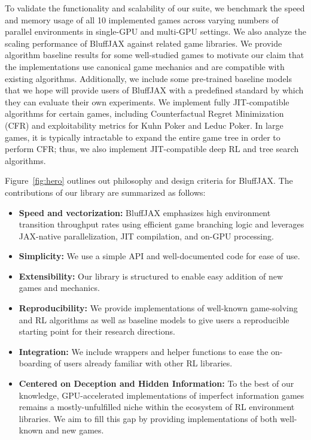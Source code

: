 To validate the functionality and scalability of our suite, we benchmark the speed and memory usage of all 10 implemented games across varying numbers of parallel environments in single-GPU and multi-GPU settings. We also analyze the scaling performance of BluffJAX against related game libraries. We provide algorithm baseline results for some well-studied games to motivate our claim that the implementations use canonical game mechanics and are compatible with existing algorithms. Additionally, we include some pre-trained baseline models that we hope will provide users of BluffJAX with a predefined standard by which they can evaluate their own experiments. We implement fully JIT-compatible algorithms for certain games, including Counterfactual Regret Minimization~\citep{zinkevich2007regret} (CFR) and exploitability metrics for Kuhn Poker and Leduc Poker. In large games, it is typically intractable to expand the entire game tree in order to perform CFR; thus, we also implement JIT-compatible deep RL and tree search algorithms.

Figure~\ref{fig:hero} outlines out philosophy and design criteria for BluffJAX. The contributions of our library are summarized as follows:
\begin{itemize}
    \item \textbf{Speed and vectorization:} BluffJAX emphasizes high environment transition throughput rates using efficient game branching logic and leverages JAX-native parallelization, JIT compilation, and on-GPU processing. 
    \item \textbf{Simplicity:} We use a simple API and well-documented code for ease of use.
    \item \textbf{Extensibility:} Our library is structured to enable easy addition of new games and mechanics.
    \item \textbf{Reproducibility:} We provide implementations of well-known game-solving and RL algorithms as well as baseline models to give users a reproducible starting point for their research directions.
    \item \textbf{Integration:} We include wrappers and helper functions to ease the on-boarding of users already familiar with other RL libraries.
    \item \textbf{Centered on Deception and Hidden Information:} To the best of our knowledge, GPU-accelerated implementations of imperfect information games remains a mostly-unfulfilled niche within the ecosystem of RL environment libraries. We aim to fill this gap by providing implementations of both well-known and new games.
\end{itemize}